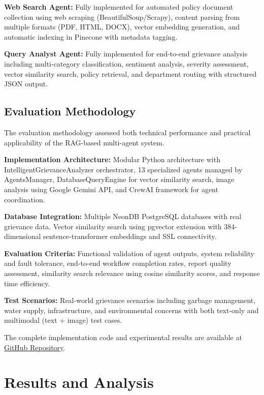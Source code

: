 \documentclass[conference]{IEEEtran}
\begin{document}
\textbf{Web Search Agent:} Fully implemented for automated policy document collection using web scraping (BeautifulSoup/Scrapy), content parsing from multiple formats (PDF, HTML, DOCX), vector embedding generation, and automatic indexing in Pinecone with metadata tagging.

\textbf{Query Analyst Agent:} Fully implemented for end-to-end grievance analysis including multi-category classification, sentiment analysis, severity assessment, vector similarity search, policy retrieval, and department routing with structured JSON output.

\subsection{Evaluation Methodology}

The evaluation methodology assessed both technical performance and practical applicability of the RAG-based multi-agent system.

\textbf{Implementation Architecture:}
Modular Python architecture with IntelligentGrievanceAnalyzer orchestrator, 13 specialized agents managed by AgentsManager, DatabaseQueryEngine for vector similarity search, image analysis using Google Gemini API, and CrewAI framework for agent coordination.

\textbf{Database Integration:}
Multiple NeonDB PostgreSQL databases with real grievance data. Vector similarity search using pgvector extension with 384-dimensional sentence-transformer embeddings and SSL connectivity.

\textbf{Evaluation Criteria:}
Functional validation of agent outputs, system reliability and fault tolerance, end-to-end workflow completion rates, report quality assessment, similarity search relevance using cosine similarity scores, and response time efficiency.

\textbf{Test Scenarios:}
Real-world grievance scenarios including garbage management, water supply, infrastructure, and environmental concerns with both text-only and multimodal (text + image) test cases.

The complete implementation code and experimental results are available at \href{https://github.com/kunalpro379/BEProject_Grivance_Redressal_Agent}{GitHub Repository}.

\section{Results and Analysis}
\end{document}
